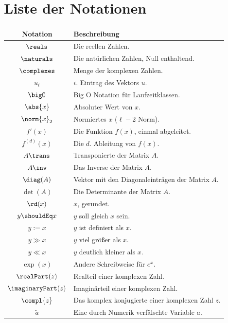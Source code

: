 	
	\newpage
\section{Liste der Notationen}

	\sbreak
	\begin{center}
		\begin{tabular}{cp{12cm}}
			\toprule
			Notation						&	Beschreibung\\
			\midrule
			$\reals$						&	Die reellen Zahlen. \\%
			$\naturals$						&	Die natürlichen Zahlen, Null enthaltend. \\
			$\complexes$					&	Menge der komplexen Zahlen. \\
			$u_i$							&	$i$. Eintrag des Vektors $u$. \\
			$\bigO$							&	Big O Notation für Laufzeitklassen.\\
			$\abs{x}$						&	Absoluter Wert von $x$. \\
			$\norm{x}_2$					&	Normiertes $x$ ($\ell-2$ Norm). \\
			$f'(x)$							&	Die Funktion $f(x)$, einmal abgeleitet. \\
			$f^{(d)}(x)$					&	Die $d$. Ableitung von $f(x)$. \\
			$A\trans$						&	Transponierte der Matrix $A$. \\
			$A\inv$							&	Das Inverse der Matrix $A$. \\
			$\diag(A)$						&	Vektor mit den Diagonaleinträgen der Matrix $A$. \\
			$\det(A)$						&	Die Determinante der Matrix $A$. \\
			$\rd(x)$						&	$x$, gerundet. \\
			$y \shouldEq x$					&	$y$ soll gleich $x$ sein. \\
			$y := x$						& 	$y$ ist definiert als $x$. \\
			$y \gg x$						&	$y$ viel größer als $x$. \\
			$y \ll x$						&	$y$ deutlich kleiner als $x$. \\
			$\exp(x)$						&	Andere Schreibweise für $e^x$. \\
			$\realPart(z)$					&	Realteil einer komplexen Zahl. \\
			$\imaginaryPart(z)$				&	Imaginärteil einer komplexen Zahl. \\
			$\compl{z}$						&	Das komplex konjugierte einer komplexen Zahl $z$. \\
			$\tilde{a}$						&	Eine durch Numerik verfälschte Variable $a$. \\
			\bottomrule
		\end{tabular}
	\end{center}
			
